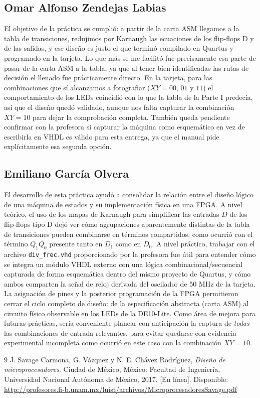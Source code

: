 \subsection{Omar Alfonso Zendejas Labias}

El objetivo de la práctica se cumplió: a partir de la carta ASM llegamos a la tabla de
transiciones, redujimos por Karnaugh las ecuaciones de los flip-flops D y de las
salidas, y ese diseño es justo el que terminó compilado en Quartus y programado en la
tarjeta. Lo que más se me facilitó fue precisamente esa parte de pasar de la carta ASM a
la tabla, ya que al tener bien identificadas las rutas de decisión el llenado fue
prácticamente directo. En la tarjeta, para las combinaciones que sí alcanzamos a
fotografiar ($XY=00$, $01$ y $11$) el comportamiento de los LEDs coincidió con lo que la
tabla de la Parte I predecía, así que el diseño quedó validado, aunque nos falta
capturar la combinación $XY=10$ para dejar la comprobación completa. También queda
pendiente confirmar con la profesora si capturar la máquina como esquemático en vez de
escribirla en VHDL es válido para esta entrega, ya que el manual pide explícitamente esa
segunda opción.

\subsection{Emiliano García Olvera}

El desarrollo de esta práctica ayudó a consolidar la relación entre el diseño lógico
de una máquina de estados y su implementación física en una FPGA. A nivel teórico, el
uso de los mapas de Karnaugh para simplificar las entradas $D$ de los flip-flops tipo
D dejó ver cómo agrupaciones aparentemente distintas de la tabla de transiciones
pueden combinarse en términos compartidos, como ocurrió con el término $Q_1\overline{Q_0}$
presente tanto en $D_1$ como en $D_0$. A nivel práctico, trabajar con el archivo
\texttt{div\_frec.vhd} proporcionado por la profesora fue útil para entender cómo se
integra un módulo VHDL externo con una lógica combinacional/secuencial capturada de
forma esquemática dentro del mismo proyecto de Quartus, y cómo ambos comparten la
señal de reloj derivada del oscilador de 50 MHz de la tarjeta. La asignación de pines
y la posterior programación de la FPGA permitieron cerrar el ciclo completo de
diseño: de la especificación abstracta (carta ASM) al circuito físico observable en
los LEDs de la DE10-Lite. Como área de mejora para futuras prácticas, sería
conveniente planear con anticipación la captura de \emph{todas} las combinaciones de
entrada relevantes, para evitar quedarse con evidencia experimental incompleta como
ocurrió en este caso con la combinación $XY=10$.

\begin{thebibliography}{9}
 J. Savage Carmona, G. Vázquez y N. E. Chávez Rodríguez,
  \emph{Diseño de microprocesadores}. Ciudad de México, México: Facultad de Ingeniería,
  Universidad Nacional Autónoma de México, 2017. [En línea]. Disponible:
  \url{http://profesores.fi-b.unam.mx/luist/archivos/MicroprocesadoresSavage.pdf}
\end{thebibliography}

